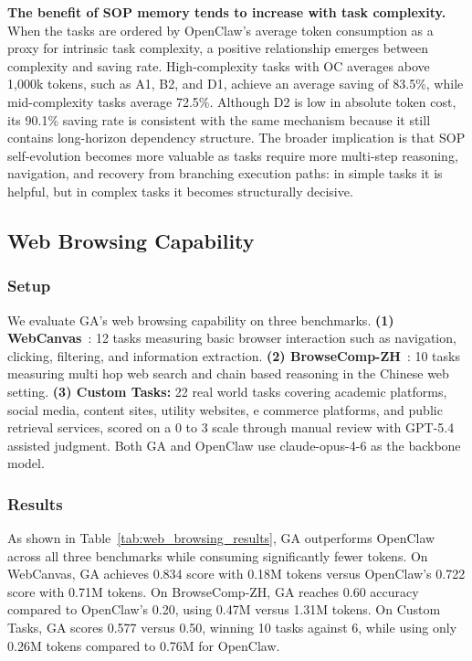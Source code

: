 \textbf{The benefit of SOP memory tends to increase with task complexity.} When the tasks are ordered by OpenClaw's average token consumption as a proxy for intrinsic task complexity, a positive relationship emerges between complexity and saving rate. High-complexity tasks with OC averages above 1,000k tokens, such as A1, B2, and D1, achieve an average saving of 83.5\%, while mid-complexity tasks average 72.5\%. Although D2 is low in absolute token cost, its 90.1\% saving rate is consistent with the same mechanism because it still contains long-horizon dependency structure. The broader implication is that SOP self-evolution becomes more valuable as tasks require more multi-step reasoning, navigation, and recovery from branching execution paths: in simple tasks it is helpful, but in complex tasks it becomes structurally decisive.

\subsection{Web Browsing Capability}
\label{sec:exp_browsing}

\subsubsection{Setup}
\label{sec:exp_browsing_setup}

We evaluate GA's web browsing capability on three benchmarks.
\textbf{(1) WebCanvas}~\citep{webcanvas}: 12 tasks measuring basic browser interaction such as navigation, clicking, filtering, and information extraction.
\textbf{(2) BrowseComp-ZH}~\citep{browsecomp_zh}: 10 tasks measuring multi hop web search and chain based reasoning in the Chinese web setting.
\textbf{(3) Custom Tasks:} 22 real world tasks covering academic platforms, social media, content sites, utility websites, e commerce platforms, and public retrieval services, scored on a 0 to 3 scale through manual review with GPT-5.4 assisted judgment.
Both GA and OpenClaw use claude-opus-4-6 as the backbone model.

\subsubsection{Results}
\label{sec:exp_browsing_results}

As shown in Table~\ref{tab:web_browsing_results}, GA outperforms OpenClaw across all three benchmarks while consuming significantly fewer tokens. On WebCanvas, GA achieves 0.834 score with 0.18M tokens versus OpenClaw's 0.722 score with 0.71M tokens. On BrowseComp-ZH, GA reaches 0.60 accuracy compared to OpenClaw's 0.20, using 0.47M versus 1.31M tokens. On Custom Tasks, GA scores 0.577 versus 0.50, winning 10 tasks against 6, while using only 0.26M tokens compared to 0.76M for OpenClaw.

